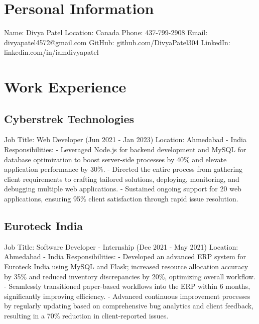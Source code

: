 \documentclass{article}%
\begin{document}
%
\normalsize%
\section{Personal Information}%
\label{sec:PersonalInformation}%
Name: Divya Patel%
\linebreak%
Location: Canada%
\linebreak%
Phone: 437{-}799{-}2908%
\linebreak%
Email: divyapatel4572@gmail.com%
\linebreak%
GitHub: github.com/DivyaPatel304%
\linebreak%
LinkedIn: linkedin.com/in/iamdivyapatel

%
\section{Work Experience}%
\label{sec:WorkExperience}%
\subsection{Cyberstrek Technologies}%
\label{subsec:CyberstrekTechnologies}%
Job Title: Web Developer (Jun 2021 {-} Jan 2023)%
\linebreak%
Location: Ahmedabad {-} India%
\linebreak%
Responsibilities:%
\linebreak%
{-} Leveraged Node.js for backend development and MySQL for database optimization to boost server{-}side processes by 40\% and elevate application performance by 30\%.%
\linebreak%
{-} Directed the entire process from gathering client requirements to crafting tailored solutions, deploying, monitoring, and debugging multiple web applications.%
\linebreak%
{-} Sustained ongoing support for 20 web applications, ensuring 95\% client satisfaction through rapid issue resolution.%
\linebreak

%
\subsection{Euroteck India}%
\label{subsec:EuroteckIndia}%
Job Title: Software Developer {-} Internship (Dec 2021 {-} May 2021)%
\linebreak%
Location: Ahmedabad {-} India%
\linebreak%
Responsibilities:%
\linebreak%
{-} Developed an advanced ERP system for Euroteck India using MySQL and Flask; increased resource allocation accuracy by 35\% and reduced inventory discrepancies by 20\%, optimizing overall workflow.%
\linebreak%
{-} Seamlessly transitioned paper{-}based workflows into the ERP within 6 months, significantly improving efficiency.%
\linebreak%
{-} Advanced continuous improvement processes by regularly updating based on comprehensive bug analytics and client feedback, resulting in a 70\% reduction in client{-}reported issues.%
\linebreak
\end{document}
